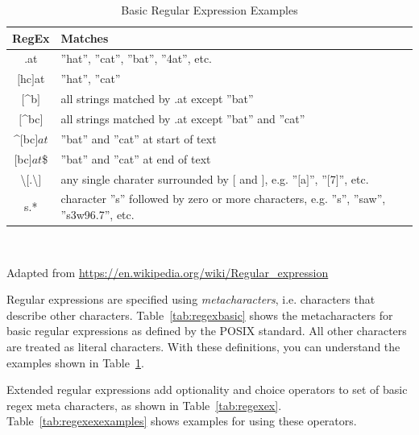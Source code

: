 \begin{table}[h]
\small 
\centering

\renewcommand{\arraystretch}{1.25}

\begin{tabularx}{\textwidth}{c|X} \hline
{\bf RegEx} & {\bf Matches} \\ \hline \hline
.at & ''hat'', ''cat'', ''bat'', ''4at'', etc. \\ \hline
$[$hc$]$at & ''hat'', ''cat'' \\ \hline
$[$\^{ }b$]$ & all strings matched by .at except ''bat'' \\ \hline
$[$\^{ }bc$]$ & all strings matched by .at except ''bat'' and ''cat'' \\ \hline
\^{ }$[$bc$]at$ & ''bat'' and ''cat'' at start of text \\ \hline
$[$bc$]at$\$ & ''bat'' and ''cat'' at end of text \\ \hline
\textbackslash $[$.\textbackslash$]$ & any single charater surrounded by $[$ and $]$, e.g. ''$[$a$]$'', ''$[$7$]$'', etc. \\ \hline
s.* & character ''s'' followed by zero or more characters, e.g. ''s'', ''saw'', ''s3w96.7'', etc. \\ \hline
\end{tabularx} \\
\vspace{.5\baselineskip}

{\footnotesize Adapted from \url{https://en.wikipedia.org/wiki/Regular_expression}} 

\caption{Basic Regular Expression Examples}
\label{tab:regexbasicexamples}
\end{table}

Regular expressions are specified using \emph{metacharacters}, i.e. characters that describe other characters. Table~\ref{tab:regexbasic} shows the metacharacters for basic regular expressions as defined by the POSIX standard. All other characters are treated as literal characters. With these definitions, you can understand the examples shown in Table~\ref{tab:regexbasicexamples}.

Extended regular expressions add optionality and choice operators to set of basic regex meta characters, as shown in Table~\ref{tab:regexex}. Table~\ref{tab:regexexexamples} shows examples for using these operators.

